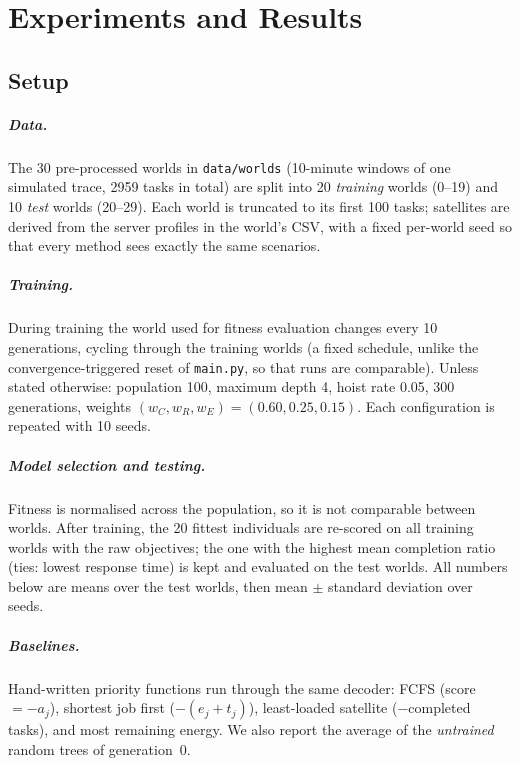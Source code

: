 \chapter{Experiments and Results}
\label{ch:exp}

\section{Setup}
\paragraph{Data.} The 30 pre-processed worlds in \texttt{data/worlds} (10-minute
windows of one simulated trace, 2959 tasks in total) are split into 20
\emph{training} worlds (0--19) and 10 \emph{test} worlds (20--29). Each world is
truncated to its first 100 tasks; satellites are derived from the server
profiles in the world's CSV, with a fixed per-world seed so that every method
sees exactly the same scenarios.

\paragraph{Training.} During training the world used for fitness evaluation
changes every 10 generations, cycling through the training worlds (a fixed
schedule, unlike the convergence-triggered reset of \texttt{main.py}, so that
runs are comparable). Unless stated otherwise: population 100, maximum depth 4,
hoist rate 0.05, 300 generations, weights $(w_C,w_R,w_E)=(0.60,0.25,0.15)$.
Each configuration is repeated with 10 seeds.

\paragraph{Model selection and testing.} Fitness is normalised across the
population, so it is not comparable between worlds. After training, the 20
fittest individuals are re-scored on all training worlds with the raw
objectives; the one with the highest mean completion ratio (ties: lowest
response time) is kept and evaluated on the test worlds. All numbers below are
means over the test worlds, then mean $\pm$ standard deviation over seeds.

\paragraph{Baselines.} Hand-written priority functions run through the same
decoder: FCFS (score $=-a_j$), shortest job first ($-(e_j+t_j)$), least-loaded
satellite ($-$completed tasks), and most remaining energy. We also report the
average of the \emph{untrained} random trees of generation~0.

